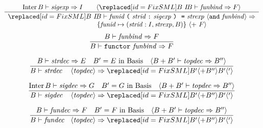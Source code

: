 %
\begin{equation}        %
\frac{
      \Inter\B\ts\sigexp\ra\I\qquad
      \langle\FIXREPL{\B\ }{\IB}\ts\funbind\ra\F\rangle
     }
     {
      \begin{array}{c}
       \FIXREPL{\B\ }{\IB}\ts\barefunstrbinder\ \optfunbinda\ra\\
       \qquad\qquad \qquad
              \{\funid\mapsto(\strid:\I,\strexp,\B)\}
              \ \langle +\ \F\rangle
      \end{array}
     }\index{62.5}
\end{equation}
\oldpagebreak
{}
\begin{equation}        %
\frac{ \B\ts\funbind\ra\F }
     { \B\ts\singfundec\ra\F }\index{63.1}
\end{equation}

\begin{equation}        %
\frac{\B\ts\strdec\ra\E\quad\B' =\E\ \In\ \Basis\quad\langle \B+\B'\ts\topdec\ra\B''\rangle }
     {\B\ts\strdecintopdec\ra\FIXREPL{\B'\langle+\B''\rangle}{\B'\langle{}'\rangle}
     }\index{63.2}
\end{equation}

\vspace{6pt}
\begin{equation}        %
\frac{\Inter\B\ts\sigdec\ra\G\quad B' = \G\ \In\ \Basis\quad
       \langle \B + \B'\ts\topdec\ra\B''\rangle}
     {\B\ts\sigdecintopdec\ra \FIXREPL{\B'\langle+\B''\rangle}{\B'\langle{}'\rangle}
     }
\end{equation}

\vspace{6pt}
\begin{equation}        %
\frac{\B\ts\fundec\ra\F\quad \B' = \F\ \In\ \Basis\quad
       \langle \B + \B'\ts\topdec\ra\B''\rangle}
     {\B\ts\fundecintopdec\ra\FIXREPL{\B'\langle+\B''\rangle}{\B'\langle{}'\rangle}
     }
\end{equation}
